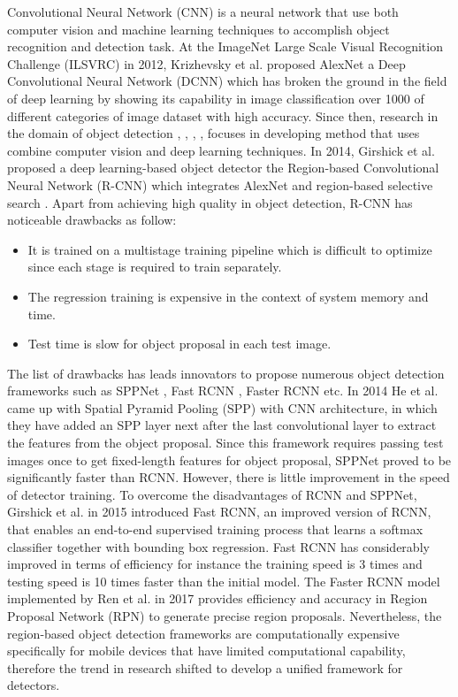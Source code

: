 Convolutional Neural Network (CNN) is a neural network that use both computer vision and machine learning techniques to accomplish object recognition and detection task. At the ImageNet Large Scale Visual Recognition Challenge (ILSVRC) in 2012, Krizhevsky et al. \cite{NIPS2012_4824} proposed AlexNet a Deep Convolutional Neural Network (DCNN) which has broken the ground in the field of deep learning by showing its capability in image classification over 1000 of different categories of image dataset with high accuracy. Since then, research in the domain of object detection \cite{girshick2014}, \cite{He_2014}, \cite{7410526}, \cite{sermanet2014}, \cite{NIPS2015} focuses in developing method that uses combine computer vision and deep learning techniques. In 2014, Girshick et al. \cite{girshick2014} proposed a deep learning-based object detector the Region-based Convolutional Neural Network (R-CNN) which integrates AlexNet \cite{NIPS2012_4824} and region-based selective search \cite{Uijlings}. Apart from achieving high quality in object detection, R-CNN has noticeable drawbacks \cite{7410526} as follow: 

\begin{itemize}
    \item It is trained on a multistage training pipeline which is difficult to optimize since each stage is required to train separately.  
    \item The regression training is expensive in the context of system memory and time. 
    \item Test time is slow for object proposal in each test image. 
\end{itemize}

The list of drawbacks has leads innovators to propose numerous object detection frameworks such as SPPNet \cite{He_2014}, Fast RCNN \cite{7410526}, Faster RCNN \cite{ren2016faster} \cite{chen2017} etc. In 2014 He et al. came up with Spatial Pyramid Pooling (SPP) with CNN architecture, in which they have added an SPP layer next after the last convolutional layer to extract the features from the object proposal. Since this framework requires passing test images once to get fixed-length features for object proposal, SPPNet proved to be significantly faster than RCNN. However, there is little improvement in the speed of detector training. To overcome the disadvantages of RCNN and SPPNet, Girshick et al. \cite{7410526} in 2015 introduced Fast RCNN, an improved version of RCNN, that enables an end-to-end supervised training process that learns a softmax classifier together with bounding box regression. Fast RCNN has considerably improved in terms of efficiency for instance the training speed is 3 times and testing speed is 10 times faster than the initial model. The Faster RCNN model implemented by Ren et al. in 2017 provides efficiency and accuracy in Region Proposal Network (RPN) to generate precise region proposals. Nevertheless, the region-based object detection frameworks are computationally expensive specifically for mobile devices that have limited computational capability, therefore the trend in research shifted to develop a unified framework for detectors. 

